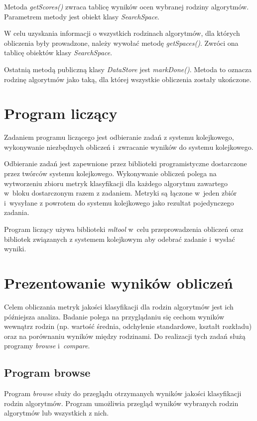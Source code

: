 \documentclass[../thesis.tex]{subfiles}
\begin{document}
Metoda \emph{getScores()} zwraca tablicę wyników ocen wybranej rodziny algorytmów. Parametrem metody jest obiekt klasy \emph{SearchSpace}.

W celu uzyskania informacji o wszystkich rodzinach algorytmów, dla których obliczenia były prowadzone, należy wywołać metodę \emph{getSpaces()}. Zwróci ona tablicę obiektów klasy \emph{SearchSpace}.

Ostatnią metodą publiczną klasy \emph{DataStore} jest \emph{markDone()}. Metoda to oznacza rodzinę algorytmów jako taką, dla której wszystkie obliczenia zostały ukończone.

\section{Program liczący}

Zadaniem programu liczącego jest odbieranie zadań z systemu kolejkowego, wykonywanie niezbędnych obliczeń i~zwracanie wyników do systemu kolejkowego.

Odbieranie zadań jest zapewnione przez biblioteki programistyczne dostarczone przez twórców systemu kolejkowego. Wykonywanie obliczeń polega na wytworzeniu zbioru metryk klasyfikacji dla każdego algorytmu zawartego w~bloku dostarczonym razem z zadaniem. Metryki są łączone w~jeden zbiór i~wysyłane z powrotem do systemu kolejkowego jako rezultat pojedynczego zadania.

Program liczący używa biblioteki \emph{mltool} w~celu przeprowadzenia obliczeń oraz bibliotek związanych z systemem kolejkowym aby odebrać zadanie i~wysłać wyniki.

\section{Prezentowanie wyników obliczeń}

Celem obliczania metryk jakości klasyfikacji dla rodzin algorytmów jest ich późniejsza analiza. Badanie polega na przyglądaniu się cechom wyników wewnątrz rodzin (np. wartość średnia, odchylenie standardowe, kształt rozkładu) oraz na porównaniu wyników między rodzinami. Do realizacji tych zadań służą programy \emph{browse} i~\emph{compare}.

\subsection{Program browse}

Program \emph{browse} służy do przeglądu otrzymanych wyników jakości klasyfikacji rodzin algorytmów. Program umożliwia przegląd wyników wybranych rodzin algorytmów lub wszystkich z nich.
\end{document}
